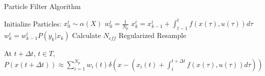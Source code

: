 \documentclass{beamer}
\begin{document}
\begin{frame}{Particle Filter Algorithm}
\footnotesize
\begin{algorithm}
\begin{algorithmic}
\STATE Initialize Particles:
    \STATE $x^i_0  \sim \alpha(X)$
    \STATE $w^i_0 = \frac{1}{N_p}$
\ENDFOR
{}
        \STATE $x^i_k = x^i_{k-1} + \int_{t-1}^t f(x(\tau), u(\tau)) d\tau $
        \STATE $w^i_k = w^i_{k-1}P(y_k | x_k)$
    \ENDFOR
    \STATE Calculate $N_{eff}$ 
        \STATE Regularized Resample 
    \ENDIF
\ENDFOR

\STATE At $t + \Delta t$, $t \in T$, $P(x(t+\Delta t)) \approx 
\sum_{i=1}^{N_p} w_i(t)\delta\left(x - (x_i(t) + \int_t^{t+\Delta t} f(x(\tau), u(\tau)) d\tau) \right)$
 \end{algorithmic}
 \end{algorithm}
\end{frame}
\end{document}
